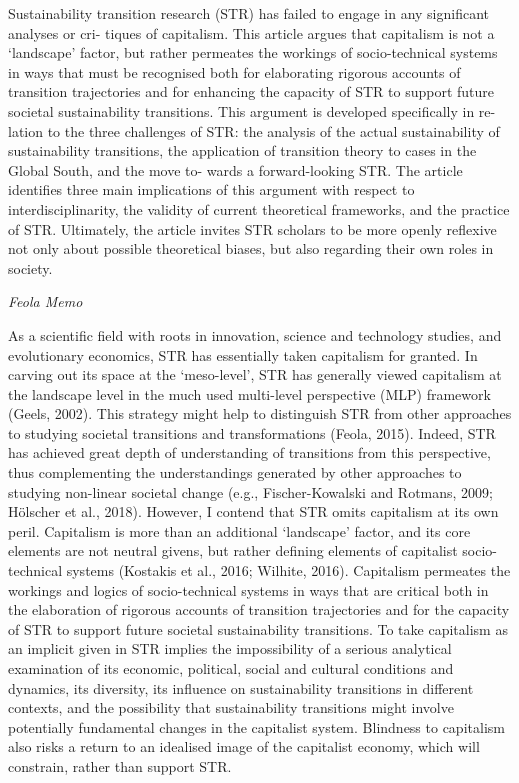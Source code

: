 \documentclass[
]{book}
\begin{document}
Sustainability transition research (STR) has failed to engage in any significant analyses or cri-
tiques of capitalism. This article argues that capitalism is not a `landscape' factor, but rather
permeates the workings of socio-technical systems in ways that must be recognised both for
elaborating rigorous accounts of transition trajectories and for enhancing the capacity of STR to
support future societal sustainability transitions. This argument is developed specifically in re-
lation to the three challenges of STR: the analysis of the actual sustainability of sustainability
transitions, the application of transition theory to cases in the Global South, and the move to-
wards a forward-looking STR. The article identifies three main implications of this argument with
respect to interdisciplinarity, the validity of current theoretical frameworks, and the practice of
STR. Ultimately, the article invites STR scholars to be more openly reflexive not only about
possible theoretical biases, but also regarding their own roles in society.

\emph{Feola Memo}

As a scientific field with roots in innovation, science and technology studies, and evolutionary economics, STR has essentially
taken capitalism for granted. In carving out its space at the `meso-level', STR has generally viewed capitalism at the landscape level in
the much used multi-level perspective (MLP) framework (Geels, 2002). This strategy might help to distinguish STR from other
approaches to studying societal transitions and transformations (Feola, 2015). Indeed, STR has achieved great depth of understanding
of transitions from this perspective, thus complementing the understandings generated by other approaches to studying non-linear
societal change (e.g., Fischer-Kowalski and Rotmans, 2009; Hölscher et al., 2018).
However, I contend that STR omits capitalism at its own peril. Capitalism is more than an additional `landscape' factor, and its
core elements are not neutral givens, but rather defining elements of capitalist socio-technical systems (Kostakis et al., 2016; Wilhite,
2016). Capitalism permeates the workings and logics of socio-technical systems in ways that are critical both in the elaboration of
rigorous accounts of transition trajectories and for the capacity of STR to support future societal sustainability transitions. To take
capitalism as an implicit given in STR implies the impossibility of a serious analytical examination of its economic, political, social
and cultural conditions and dynamics, its diversity, its influence on sustainability transitions in different contexts, and the possibility
that sustainability transitions might involve potentially fundamental changes in the capitalist system. Blindness to capitalism also
risks a return to an idealised image of the capitalist economy, which will constrain, rather than support STR.
\end{document}
